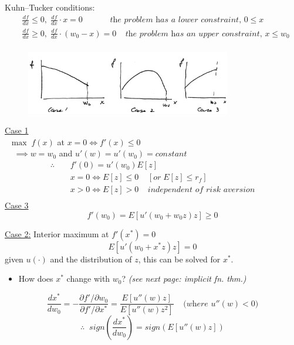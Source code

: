 \documentclass[
14pt,notheorems,hyperref={pdfauthor=whatever}
]{beamer}
\begin{document}
\begin{frame}
Kuhn–Tucker conditions:
\begin{align*}
    &\frac{df}{dx} \boldsymbol\leq 0,\;\frac{df}{dx}\cdot x=0 \;\;\;\;\;\;\;\;\;\;\;\;\textit{the problem has a lower constraint, $0\leq x$}\\
    &\frac{df}{dx} \boldsymbol\geq 0,\;\frac{df}{dx}\cdot (w_0-x)=0 \;\;\;\;\textit{the problem has an upper constraint, $x\leq w_0$}\\
\end{align*}
\begin{figure}[threecases]
    \includegraphics[width=0.8\textwidth]{L4-three-cases.png}
    \centering
\end{figure}
\end{frame}

\begin{frame}
\underline{Case 1}\\
\hfill \break
$\;\;\max\;f(x)$ at $x=0 \iff f'(x) \leq 0$\\
$\;\;\;\;\implies w=w_0$ and $u'(w) = u'(w_0) = \textit{constant}$\\
\begin{align*}
    \therefore \;\;\;\;&f'(0) = u'(w_0)E[z]\\
    &x=0 \iff E[z] \leq 0 \;\;\;\; [or\; E[z] \leq r_f]\\
    &x>0 \iff E[z] > 0\;\;\;\; \textit{independent of risk aversion}\\
\end{align*}
\underline{Case 3}\\
\[f'(w_0) = E[u'(w_0+w_0z)z] \geq 0\]
\end{frame}

\begin{frame}
\underline{Case 2:} Interior maximum at $f'(x^*)=0$\\
\[E[u'(w_0+x^*z)z] = 0\]
\hfill \break
given $u(\cdot)$ and the distribution of $z$, this can be solved for $x^*$.\\
\hfill \break
\begin{itemize}
    \item How does $x^*$ change with $w_0$? \textit{(see next page: implicit fn. thm.)}\\
\end{itemize}
\[\frac{dx^*}{dw_0} = -\frac{\partial f'/\partial w_0}{\partial f'/\partial x^*} = \frac{E[u''(w)z]}{E[u''(w)z^2]}\;\;\;\;\textit{(where $u''(w) < 0$)}\]
\[\therefore \;\; sign(\frac{dx^*}{dw_0}) = sign(E[u''(w)z])\]
\end{frame}
\end{document}
